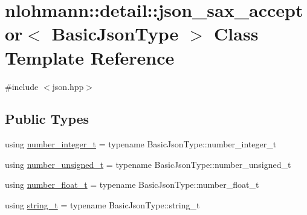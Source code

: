 \hypertarget{classnlohmann_1_1detail_1_1json__sax__acceptor}{}\section{nlohmann\+::detail\+::json\+\_\+sax\+\_\+acceptor$<$ Basic\+Json\+Type $>$ Class Template Reference}
\label{classnlohmann_1_1detail_1_1json__sax__acceptor}


{\ttfamily \#include $<$json.\+hpp$>$}

\subsection*{Public Types}
\begin{DoxyCompactItemize}
\item 
using \mbox{\hyperlink{classnlohmann_1_1detail_1_1json__sax__acceptor_a41876b17c0e8bdb55580eaf5e4e2ded8}{number\+\_\+integer\+\_\+t}} = typename Basic\+Json\+Type\+::number\+\_\+integer\+\_\+t
\item 
using \mbox{\hyperlink{classnlohmann_1_1detail_1_1json__sax__acceptor_ae07454608ea6f3cfb765f95e3c850043}{number\+\_\+unsigned\+\_\+t}} = typename Basic\+Json\+Type\+::number\+\_\+unsigned\+\_\+t
\item 
using \mbox{\hyperlink{classnlohmann_1_1detail_1_1json__sax__acceptor_a5502f483fc60a1bcd73e0e46b6ab36e4}{number\+\_\+float\+\_\+t}} = typename Basic\+Json\+Type\+::number\+\_\+float\+\_\+t
\item 
using \mbox{\hyperlink{classnlohmann_1_1detail_1_1json__sax__acceptor_a3a8078bbf865ec355106f6048241609a}{string\+\_\+t}} = typename Basic\+Json\+Type\+::string\+\_\+t
\end{DoxyCompactItemize}
